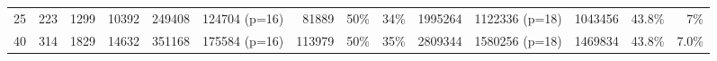\begin{table*}[p]
\begin{tabular}{rrrr|rrrrr|rrrrr}
    25 & 223 & 1299 & 10392 & 249408 & 124704 (p=16) & 81889 & 50\%& 34\%& 1995264 & 1122336 (p=18)& 1043456 & 43.8\%& 7\% \\
    
    40 & 314 & 1829& 14632& 351168& 175584 (p=16)& 113979& 50\%& 35\%& 2809344& 1580256 (p=18)& 1469834& 43.8\%& 7.0\% \\
    
    \bottomrule
  \end{tabular}
\end{table*}